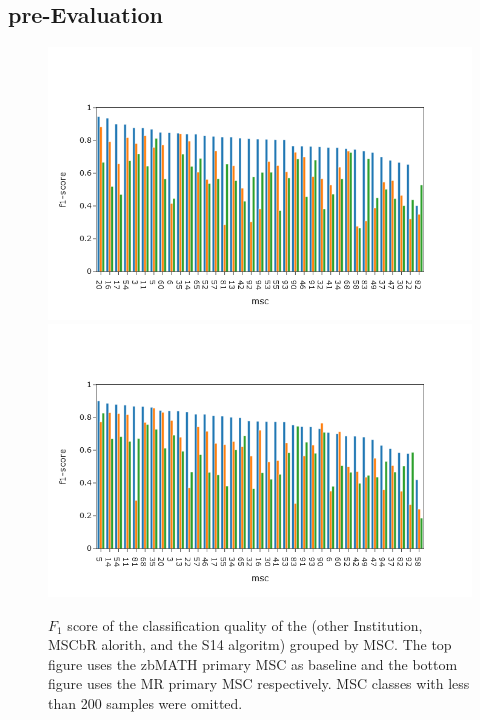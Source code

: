 \subsection{pre-Evaluation}
\begin{figure}[h]
  \centering
  \includegraphics[width=1.1\textwidth]{zbMr.png}
  \includegraphics[width=1.1\textwidth]{mrZb.png}
  \caption{$F_1$ score of the classification quality of the (other Institution, MSCbR alorith, and the S14 algoritm) grouped by MSC. The top figure uses the zbMATH primary MSC as baseline and the bottom figure uses the MR primary MSC respectively. MSC classes with less than 200 samples were omitted. }
\end{figure}


